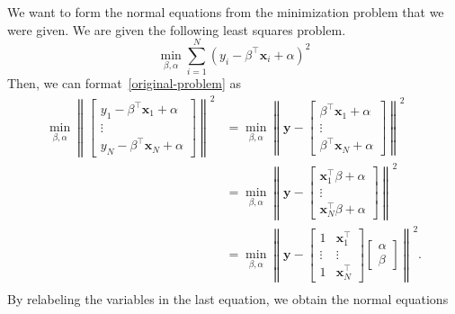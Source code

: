 \documentclass{article}
\begin{document}
We want to form the normal equations from the minimization problem that we were given.
We are given the following least squares problem.
\begin{equation}\label{original-problem}
    \min_{\beta,\alpha} \sum_{i=1}^{N}{(y_i - \beta^\top \mathbf{x}_i + \alpha)}^2
\end{equation}
Then, we can format~\ref{original-problem} as 
\begin{align*}
    \min_{\beta,\alpha} \left\|
        \begin{bmatrix}
        y_1 - \beta^\top \mathbf{x}_1 + \alpha \\
        \vdots\\
        y_N - \beta^\top \mathbf{x}_N + \alpha
    \end{bmatrix}\right\|^2 &= \min_{\beta,\alpha} \left\|\mathbf{y} - 
    \begin{bmatrix}
        \beta^\top \mathbf{x}_1 + \alpha \\
        \vdots\\
        \beta^\top \mathbf{x}_N + \alpha
    \end{bmatrix}\right\|^2 \\
    &= \min_{\beta,\alpha} \left\|\mathbf{y} - 
    \begin{bmatrix}
        \mathbf{x}_1^\top\beta + \alpha \\
        \vdots\\
        \mathbf{x}_N^\top\beta + \alpha
    \end{bmatrix}\right\|^2 \\
    &= \min_{\beta,\alpha} \left\|\mathbf{y} - 
    \begin{bmatrix}
        1 & \mathbf{x}_1^\top \\
        \vdots&\vdots\\
        1 & \mathbf{x}_N^\top
    \end{bmatrix} \begin{bmatrix}
        \alpha \\ \beta
    \end{bmatrix}\right\|^2.\\
\end{align*}
By relabeling the variables in the last equation, we obtain the normal equations
\end{document}
